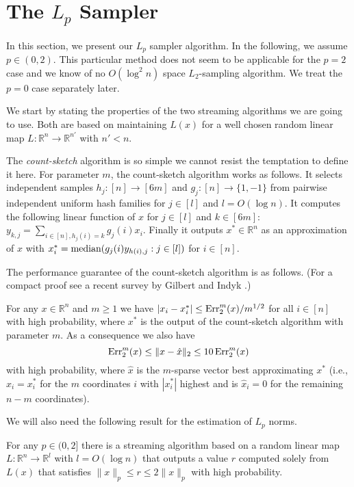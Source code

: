 \section{The $L_p$ Sampler}
\label{sec:lpsamp}
In this section, we present our $L_p$ sampler algorithm. In the following,
we assume  $p \in (0,2)$. This particular method does not seem to be
applicable for the $p=2$ case and we know of no $O(\log^2 n)$ space
$L_2$-sampling algorithm. We treat the $p=0$ case separately later.

We start by stating the properties of the two streaming algorithms we are
going to use. Both are based on maintaining $L(x)$
for a well chosen random linear map
$L:\mathbb R^n\to\mathbb R^{n'}$ with $n'<n$.

The {\em count-sketch} algorithm \cite{CharikarCF04} is so simple we cannot resist the
temptation to define it here. For parameter $m$, the count-sketch algorithm
works as follows. It selects independent samples $h_j:[n]\to[6m]$ and
$g_j:[n]\to\{1,-1\}$ from pairwise independent uniform hash families for
$j\in[l]$ and $l=O(\log n)$. It computes the following linear function of $x$
for $j\in[l]$ and $k\in[6m]$:
$y_{k,j}=\sum_{i\in[n],h_j(i)=k}g_j(i)x_i$. Finally it outputs
$x^*\in\mathbb R^n$ as an approximation of $x$ with
$x^*_i=\hbox{median}(g_j(i)y_{h(i),j}:j\in[l])$ for $i\in[n]$.

The performance guarantee of the count-sketch algorithm is as follows.
(For a compact proof see a recent survey by Gilbert and Indyk \cite{GilbertI10}.) 

\begin{lemma}
\label{c-s}
For any $x\in\mathbb R^n$ and $m\ge1$ we have
$|x_i-x^*_i|\le\operatorname{Err}_2^m(x)/m^{1/2}$
for all $i\in[n]$ with high probability,
where $x^*$ is the output of the count-sketch algorithm with parameter $m$.
As a consequence we also have
$$\operatorname{Err}_2^m(x)\le\|x-\hat x\|_2\le10\operatorname{Err}_2^m(x)$$
with high probability, where $\hat x$ is the
$m$-sparse vector best approximating $x^*$ (i.e., $\hat x_i=x^*_i$ for the
$m$ coordinates $i$ with $|x^*_i|$ highest and is $\hat x_i=0$ for the
remaining $n-m$ coordinates).
\end{lemma}

We will also need the following result for the estimation of $L_p$ norms.

\begin{lemma}
\label{norm}
For any $p\in(0,2]$ there is a streaming algorithm based on a random linear
map $L:\mathbb R^n\to\mathbb R^l$ with $l=O(\log n)$ that outputs a value $r$
computed solely from $L(x)$ that satisfies
$\|x\|_p\le r\le2\|x\|_p$
with high probability.
\end{lemma}

